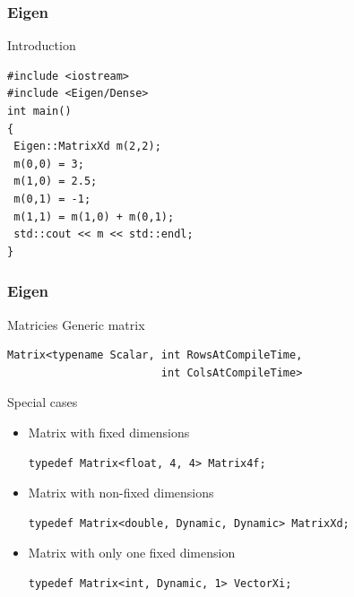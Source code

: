 \documentclass[smaller,a4paper]{beamer}
\begin{document}

\begin{frame}[fragile]

    \frametitle{Eigen}

    \begin{block}{Introduction}
        \begin{lstlisting}
#include <iostream>
#include <Eigen/Dense>
int main()
{
 Eigen::MatrixXd m(2,2);
 m(0,0) = 3;
 m(1,0) = 2.5;
 m(0,1) = -1;
 m(1,1) = m(1,0) + m(0,1);
 std::cout << m << std::endl;
}
        \end{lstlisting}
    \end{block}

\end{frame}


\begin{frame}[fragile]

    \frametitle{Eigen}

        \begin{block}{Matricies}
            Generic matrix
            \begin{lstlisting}
Matrix<typename Scalar, int RowsAtCompileTime,
                        int ColsAtCompileTime>
            \end{lstlisting}
        \end{block}

        \begin{block}{Special cases}
            \begin{itemize}
                \item Matrix with fixed dimensions
                    \begin{lstlisting}
typedef Matrix<float, 4, 4> Matrix4f;
                    \end{lstlisting}
                \item Matrix with non-fixed dimensions
                    \begin{lstlisting}
typedef Matrix<double, Dynamic, Dynamic> MatrixXd;
                    \end{lstlisting}
                \item Matrix with only one fixed dimension
                    \begin{lstlisting}
typedef Matrix<int, Dynamic, 1> VectorXi;
                    \end{lstlisting}
            \end{itemize}
        \end{block}

\end{frame}
\end{document}
